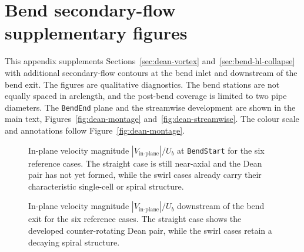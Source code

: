 \chapter{Bend secondary-flow supplementary figures}
\label{app:dean-panels}
\fancyhead{}
This appendix supplements Sections~\ref{sec:dean-vortex} and~\ref{sec:bend-hl-collapse}
with additional secondary-flow contours at the bend inlet and downstream of the bend exit.
The figures are qualitative diagnostics. The bend stations are not equally spaced
in arclength, and the post-bend coverage is limited to two pipe diameters.
The \texttt{BendEnd} plane and the streamwise development are shown in the main text,
Figures~\ref{fig:dean-montage} and~\ref{fig:dean-streamwise}. The colour scale and
annotations follow Figure~\ref{fig:dean-montage}.

\begin{figure}[H]
    \centering
    \caption[In-plane velocity at \texttt{BendStart}]{In-plane velocity magnitude $|V_{\mathrm{in\text{-}plane}}|/U_b$ at \texttt{BendStart} for the six reference cases. The straight case is still near-axial and the Dean pair has not yet formed, while the swirl cases already carry their characteristic single-cell or spiral structure.}
    \label{fig:dean-montage-bendstart}
    \label{fig:app-dean-bendstart}
\end{figure}

\begin{figure}[H]
    \centering
    \caption[In-plane velocity at \texttt{ConeEnd}]{In-plane velocity magnitude $|V_{\mathrm{in\text{-}plane}}|/U_b$ downstream of the bend exit for the six reference cases. The straight case shows the developed counter-rotating Dean pair, while the swirl cases retain a decaying spiral structure.}
    \label{fig:dean-montage-coneend}
    \label{fig:app-dean-coneend}
\end{figure}
\clearpage
